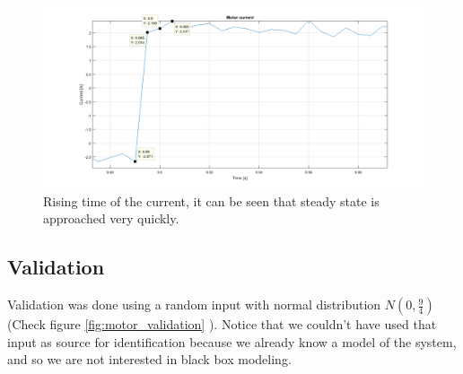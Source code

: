 \begin{figure}[!h]
    \centering
    \includegraphics[width=1\textwidth]{img/motor_id_2.png}
    \caption{Rising time of the current, it can be seen that steady state is approached very quickly.}
    \label{fig:motor_id_2}
\end{figure}
\subsection{Validation}
\label{sec:validation}
Validation was done using a random input with normal distribution $N(0,\frac{9}{4})$ (Check figure \ref{fig:motor_validation} ). Notice that we couldn't have used that input as source for identification because we already know a model of the system, and so we are not interested in black box modeling. 

